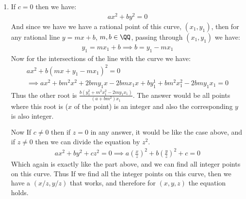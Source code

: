 \begin{enumerate}[label=]
    \item
        If $c = 0$ then we have:
        \begin{gather*}
            ax^2 + by^2 = 0 
        \end{gather*}    
        And since we have we have a rational point of this curve, $(x_1, y_1)$, then for any rational line $y = mx + b$, $m, b \in \QQ$, passing through $(x_1, y_1)$ we have:
        \begin{gather*}
            y_1 = m x_1 + b \implies b = y_1 - m x_1
        \end{gather*}
        Now for the intersections of the line with the curve we have:
        \begin{gather*}
            ax^2 + b(mx + y_1 - mx_1)^2 = 0 \\
            \implies ax^2 + bm^2x^2 + 2bmy_1x - 2bmx_1x + by_1^1 + bm^2x_1^2 - 2bmy_1x_1 = 0
        \end{gather*}
        Thus the other root is $\frac{b(y_1^2 + m^2 x_1^2 - 2my_1x_1)}{(a + bm^2)x_1}$. The answer would be all points where this root is ($x$ of the point) is an integer and also the corresponding $y$ is also integer.


        Now If $c \ne 0$ then if $z = 0$ in any answer, it would be like the case above, and if $z \ne 0$ then we can divide the equation by $z^2$.
        \begin{gather*}
            ax^2 + by^2 + cz^2 = 0 \implies a(\frac{x}{z})^2 + b(\frac{y}{z})^2 + c = 0 
        \end{gather*}
        Which again is exactly like the part above, and we can find all integer points on this curve. Thus If we find all the integer points on this curve, then we have a $(x/z, y/z)$ that works, and therefore for $(x, y, z)$ the equation holds.
\end{enumerate}
